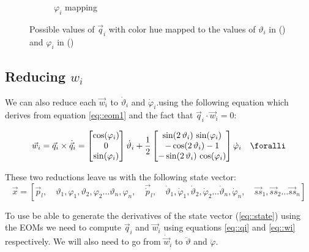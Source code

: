 \begin{figure}
\begin{subfigure}{0.45\textwidth}
		\caption{$\varphi_i$ mapping}
		\label{subfig::phi_map}
	\end{subfigure}
	\caption{Possible values of $\vec q_i$ with color hue mapped to the values of $\vartheta_i$ in (\protect{}) and $\varphi_i$ in (\protect{})}
	\label{fig::singularities}
\end{figure}

\subsection{Reducing $w_i$}
We can also reduce each $\vec w_i$ to $\dot{\vartheta}_i$ and $\dot{\varphi}_i$.using the following equation which derives from equation \ref{eq::eom1} and the fact that $\vec q_i \cdot \vec w_i =0$:


\begin{equation}
	\vec w_i = \vec q_i \times \dot{\vec q}_i = 
	\begin{bmatrix} 
		\cos(\varphi_i)\\ 
		0\\ 
		\sin(\varphi_i) 
	\end{bmatrix}\dot\vartheta_i
	+
	\frac{1}{2}
	\begin{bmatrix} 
		\sin(2\,\vartheta_i)\,\sin(\varphi_i)\\ 
		-\cos(2\,\vartheta_i)-1\\ 
		-\sin(2\,\vartheta_i)\,\cos(\varphi_i) 
	\end{bmatrix}\dot\varphi_i
	\quad \foralli
	\label{eq::wi}
\end{equation}

These two reductions leave us with the following state vector:
\begin{equation}
	\vec{x}=
	[\vec p_l ,\quad
	\vartheta_1, \varphi_1, \vartheta_2, \varphi_2 \dots \vartheta_n,\varphi_n ,\quad
	\vec{\dot{p}}_l ,\quad
	\dot \vartheta_1,\dot \varphi_1, \dot \vartheta_2,\dot \varphi_2 \dots \dot \vartheta_n,\dot \varphi_n ,\quad
	\vec{ss}_1, \vec{ss}_2 \dots \vec{ss}_n
	]
	\label{eq::state}
\end{equation}

To use be able to generate the derivatives of the state vector (\ref{eq::state}) using the \ac{EOMs} we need to compute $\vec q_i$ and $\vec w_i$ using equations \ref{eq::qi} and \ref{eq::wi} respectively. We will also need to go from $\dot{\vec w}_i$ to $\ddot\vartheta$ and $\ddot\varphi$. 

